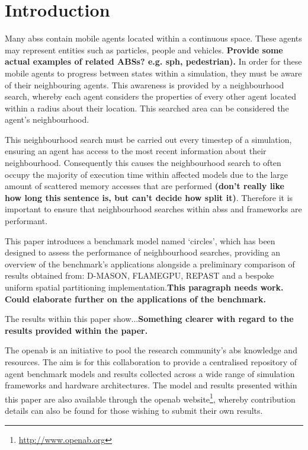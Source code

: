 
\section{Introduction}
  Many \glspl{abs} contain mobile agents located within a continuous space. These agents may represent entities such as particles, people and vehicles. \textbf{Provide some actual examples of related ABSs? e.g. sph, pedestrian).} In order for these mobile agents to progress between states within a simulation, they must be aware of their neighbouring agents. This awareness is provided by a neighbourhood search, whereby each agent considers the properties of every other agent located within a radius about their location. This searched area can be considered the agent's neighbourhood.
  
  This neighbourhood search must be carried out every timestep of a simulation, ensuring an agent has access to the most recent information about their neighbourhood. Consequently this causes the neighbourhood search to often occupy the majority of execution time within affected models due to the large amount of scattered memory accesses that are performed \textbf{ (don't really like how long this sentence is, but can't decide how split it)}. Therefore it is important to ensure that neighbourhood searches within \glspl{abs} and frameworks are performant.
  
  This paper introduces a benchmark model named `circles', which has been designed to assess the performance of neighbourhood searches, providing an overview of the benchmark's applications alongside a preliminary comparison of results obtained from: D-MASON, FLAMEGPU, REPAST and a bespoke uniform spatial partitioning implementation.\textbf{This paragraph needs work. }\textbf{Could elaborate further on the applications of the benchmark.}
  
  The results within this paper show...\textbf{Something clearer with regard to the results provided within the paper.}
  
  The \gls{openab} is an initiative to pool the research community's \gls{abs} knowledge and resources. The aim is for this collaboration to provide a centralised repository of agent benchmark models and results collected across a wide range of simulation frameworks and hardware architectures. The model and results presented within this paper are also available through the \gls{openab} website\footnote{\url{http://www.openab.org}}, whereby contribution details can also be found for those wishing to submit their own results.
  
